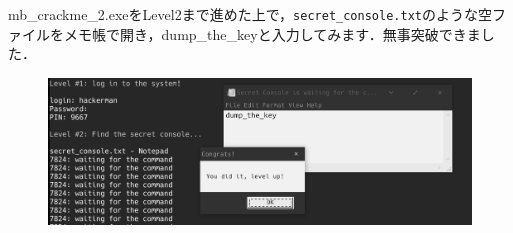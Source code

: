 mb\_crackme\_2.exeをLevel2まで進めた上で，\texttt{secret\_console.txt}のような空ファイルをメモ帳で開き，dump\_the\_keyと入力してみます．無事突破できました\faThumbsOUp ．
\begin{figure}[H]
    \centering
    \includegraphics[width=\linewidth]{./assets/takuzoo3868asset/crack_level2_gray.png}
    \label{fig:crack_level2}
\end{figure}

